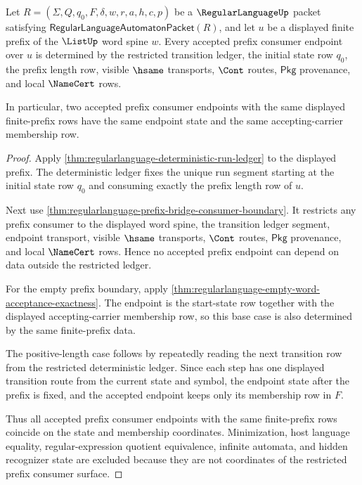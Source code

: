 \begin{theorem}
\label{thm:regularlanguage-dfa-prefix-consumer-determinacy}
Let $R=(\Sigma,Q,q_0,F,\delta,w,r,a,h,c,p)$ be a $\RegularLanguageUp$ packet
satisfying $\mathsf{RegularLanguageAutomatonPacket}(R)$, and let $u$ be a
displayed finite prefix of the $\ListUp$ word spine $w$. Every accepted prefix
consumer endpoint over $u$ is determined by the restricted transition ledger,
the initial state row $q_0$, the prefix length row, visible $\hsame$
transports, $\Cont$ routes, $\mathsf{Pkg}$ provenance, and local $\NameCert$
rows.

In particular, two accepted prefix consumer endpoints with the same displayed
finite-prefix rows have the same endpoint state and the same accepting-carrier
membership row.
\end{theorem}
\begin{proof}
Apply \autoref{thm:regularlanguage-deterministic-run-ledger} to the displayed
prefix. The deterministic ledger fixes the unique run segment starting at the
initial state row $q_0$ and consuming exactly the prefix length row of $u$.

Next use \autoref{thm:regularlanguage-prefix-bridge-consumer-boundary}. It
restricts any prefix consumer to the displayed word spine, the transition
ledger segment, endpoint transport, visible $\hsame$ transports, $\Cont$
routes, $\mathsf{Pkg}$ provenance, and local $\NameCert$ rows. Hence no
accepted prefix endpoint can depend on data outside the restricted ledger.

For the empty prefix boundary, apply
\autoref{thm:regularlanguage-empty-word-acceptance-exactness}. The endpoint is
the start-state row together with the displayed accepting-carrier membership
row, so this base case is also determined by the same finite-prefix data.

The positive-length case follows by repeatedly reading the next transition row
from the restricted deterministic ledger. Since each step has one displayed
transition route from the current state and symbol, the endpoint state after
the prefix is fixed, and the accepted endpoint keeps only its membership row in
$F$.

Thus all accepted prefix consumer endpoints with the same finite-prefix rows
coincide on the state and membership coordinates. Minimization, host language
equality, regular-expression quotient equivalence, infinite automata, and
hidden recognizer state are excluded because they are not coordinates of the
restricted prefix consumer surface.
\end{proof}

